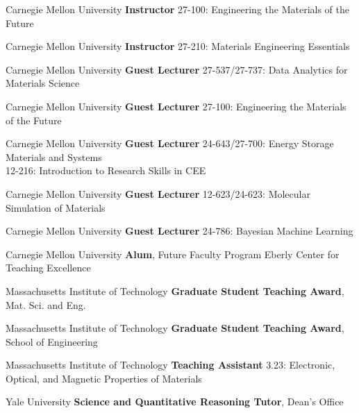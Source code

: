     {Carnegie Mellon University}
    {\textbf{Instructor}}
    {27-100: Engineering the Materials of the Future}

\vspace{-2mm}
    {Carnegie Mellon University}
    {\textbf{Instructor}}
    {27-210: Materials Engineering Essentials}

\vspace{-2mm}
\datedsubsection{}
    {Carnegie Mellon University}
    {\textbf{Guest Lecturer}}
    {27-537/27-737: Data Analytics for Materials Science}

\vspace{-2mm}
    {Carnegie Mellon University}
    {\textbf{Guest Lecturer}}
    {27-100: Engineering the Materials of the Future}

\vspace{-2mm}
    {Carnegie Mellon University}
    {\textbf{Guest Lecturer}}
    {24-643/27-700: Energy Storage Materials and Systems\\
    12-216: Introduction to Research Skills in CEE}

\vspace{-2mm}
    {Carnegie Mellon University}
    {\textbf{Guest Lecturer}}
    {12-623/24-623: Molecular Simulation of Materials}

\vspace{-2mm}
    {Carnegie Mellon University}
    {\textbf{Guest Lecturer}}
    {24-786: Bayesian Machine Learning}

\vspace{-2mm}
    {Carnegie Mellon University}
    {\textbf{Alum}, Future Faculty Program}
    {Eberly Center for Teaching Excellence}

\vspace{3mm}
{}
    {Massachusetts Institute of Technology}
    {\textbf{Graduate Student Teaching Award}, Mat. Sci. and Eng.}{}

\datedsubsectionnarrow{}
    {Massachusetts Institute of Technology}
    {\textbf{Graduate Student Teaching Award}, School of Engineering}{}

\vspace{-2mm}
    {Massachusetts Institute of Technology}
    {\textbf{Teaching Assistant}}
    {3.23: Electronic, Optical, and Magnetic Properties of Materials}

\vspace{2.2mm}
    {Yale University}
    {\textbf{Science and Quantitative Reasoning Tutor}, Dean's Office}{}

